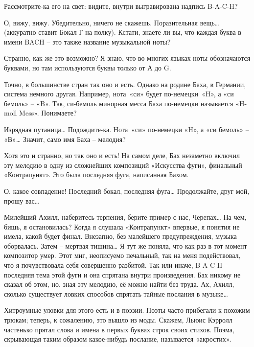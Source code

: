 \documentclass[../main.tex]{subfiles}
\begin{document}
\begin{Dialogue}
 Рассмотрите-ка его на свет: видите, внутри выгравирована надпись \mbox{B-A-C-H}?

 О, вижу, вижу. Убедительно, ничего не скажешь. Поразительная вещь\ldots{} (аккуратно ставит Бокал Г на полку). Кстати, знаете ли вы, что каждая буква в имени BACH \--- это также название музыкальной ноты?

 Странно, как же это возможно? Я знаю, что во многих языках ноты обозначаются буквами, но там используются буквы только от А до G.

 Точно, в большинстве стран так оно и есть. Однако на родине Баха, в Германии, система немного другая. Например, нота~«си» будет по-немецки~«H», а «си бемоль» \--- «B». Так, си-бемоль минорная месса Баха по-немецки называется «H-moll Mess». Понимаете?

 Изрядная путаница\ldots{} Подождите-ка. Нота~«си» по-немецки «H», а «си бемоль» \--- «В»\ldots{} Значит, само имя Баха \--- мелодия?

 Хотя это и странно, но так оно и есть! На самом деле, Бах незаметно включил эту мелодию в одну из сложнейших композиций «Искусства фуги», финальный «Контрапункт». Это была последняя фуга, написанная Бахом.

 О, какое совпадение! Последний бокал, последняя фуга\ldots{} Продолжайте, друг мой, прошу вас\ldots{}

 Милейший Ахилл, наберитесь терпения, берите пример с нас, Черепах\ldots{} На чем, бишь, я остановилась? Когда я слушала «Контрапункт» впервые, я понятия не имела, какой будет финал. Внезапно, без малейшего предупреждения, музыка оборвалась. Затем \--- мертвая тишина\ldots{} Я тут же поняла, что как раз в тот момент композитор умер. Этот миг, неописуемо печальный, так на меня подействовал, что я почувствовала себя совершенно разбитой. Так или иначе, \mbox{B-A-C-H} \--- последняя тема этой фуги и она спрятана внутри произведения. Бах никому не сказал об этом, но, зная эту мелодию, её можно найти без труда. Ах, Ахилл, сколько существует ловких способов спрятать тайные послания в музыке\ldots{}

 {\Large Х}итроумные уловки для этого есть и в поэзии. Поэты часто прибегали к похожим трюкам; теперь, к сожалению, это вышло из моды. Скажем, Льюис Кэрролл частенько прятал слова и имена в первых буквах строк своих стихов. Поэма, скрывающая таким образом какое-нибудь послание, называется «акростих».


\end{Dialogue}
\end{document}
